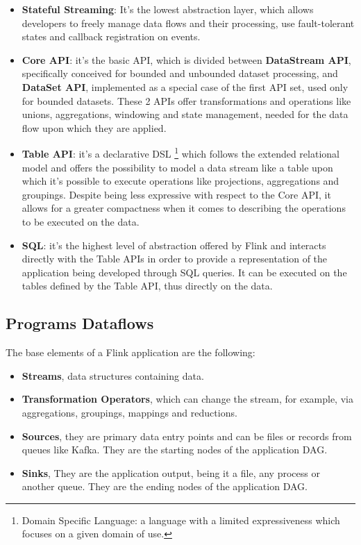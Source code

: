 \begin{itemize}
	\item \textbf{Stateful Streaming}: It's the lowest abstraction layer, which allows developers to freely manage data flows and their processing, use fault-tolerant states and callback registration on events.
	\item \textbf{Core API}: it's the basic API, which is divided between \textbf{DataStream API}, specifically conceived for bounded and unbounded dataset processing, and \textbf{DataSet API}, implemented as a special case of the first API set, used only for bounded datasets. These 2 APIs offer transformations and operations like unions, aggregations, windowing and state management, needed for the data flow upon which they are applied.
	\item \textbf{Table API}: it's a declarative DSL \footnote{Domain Specific Language: a language with a limited expressiveness which focuses on a given domain of use.} which follows the extended relational model and offers the possibility to model a data stream like a table upon which it's possible to execute operations like projections, aggregations and groupings. Despite being less expressive with respect to the Core API, it allows for a greater compactness when it comes to describing the operations to be executed on the data.
	\item \textbf{SQL}: it's the highest level of abstraction offered by Flink and interacts directly with the Table APIs in order to provide a representation of the application being developed through SQL queries. It can be executed on the tables defined by the Table API, thus directly on the data.
\end{itemize}

\subsection{Programs Dataflows}  \label{ProgramsDataflows}

The base elements of a Flink application are the following:

\begin{itemize}
	\item \textbf{Streams}, data structures containing data.
	\item \textbf{Transformation Operators}, which can change the stream, for example, via aggregations, groupings, mappings and reductions.
	\item \textbf{Sources}, they are primary data entry points and can be files or records from queues like Kafka. They are the starting nodes of the application DAG.
    \item \textbf{Sinks}, They are the application output, being it a file, any process or another queue. They are the ending nodes of the application DAG.
\end{itemize}


